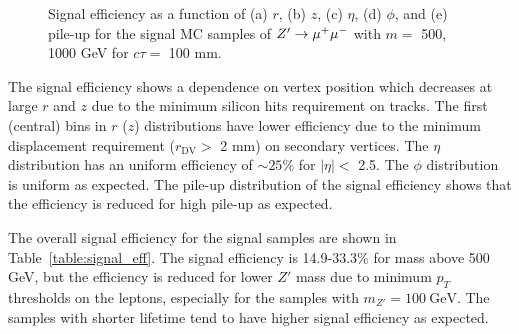 \begin{figure}[!htb]
    \caption{Signal efficiency as a function of (a) $r$, (b) $z$, (c) $\eta$, (d) $\phi$, and (e) pile-up for the signal MC samples of $Z'\rightarrow \mu^{+}\mu^{-}$ with $m=$ 500, 1000 GeV for $c\tau=$ 100 mm.}
    \label{fig:signal_vertex_dist}
\end{figure}

The signal efficiency shows a dependence on vertex position which decreases at large $r$ and $z$ due to the minimum silicon hits requirement on tracks. The first (central) bins in $r$ ($z$) distributions have lower efficiency due to the minimum displacement requirement ($r_{\mathrm{DV}} > $ 2 mm) on secondary vertices. The $\eta$ distribution has an uniform efficiency of $\sim25\%$ for $|\eta|<$ 2.5. The $\phi$ distribution is uniform as expected. The pile-up distribution of the signal efficiency shows that the efficiency is reduced for high pile-up as expected.

The overall signal efficiency for the signal samples are shown in Table~\ref{table:signal_eff}. The signal efficiency is 14.9-33.3\% for mass above 500 GeV, but the efficiency is reduced for lower $Z'$ mass due to minimum $p_{T}$ thresholds on the leptons, especially for the samples with $m_{Z'}=100~\si{\GeV}$. The samples with shorter lifetime tend to have higher signal efficiency as expected. 

